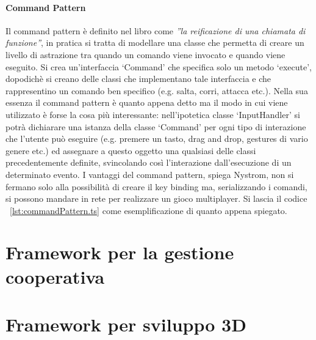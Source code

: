\paragraph{Command Pattern}
Il command pattern è definito nel libro come \textit{''la reificazione 
di una chiamata di funzione''}, in pratica si tratta di modellare una classe
che permetta di creare un livello di astrazione tra quando un comando
viene invocato e quando viene eseguito. Si crea un'interfaccia `Command'
che specifica solo un metodo `execute', dopodichè si creano delle classi
che implementano tale interfaccia e che rappresentino un comando ben specifico
(e.g. salta, corri, attacca etc.). Nella sua essenza il command pattern è quanto
appena detto ma il modo in cui viene utilizzato è forse la cosa più interessante:
nell'ipotetica classe `InputHandler' si potrà dichiarare una istanza della classe
`Command' per ogni tipo di interazione che l'utente può eseguire (e.g. premere un tasto,
drag and drop, gestures di vario genere etc.) ed assegnare a questo oggetto una qualsiasi
delle classi precedentemente definite, svincolando così l'interazione dall'esecuzione
di un determinato evento. I vantaggi del command pattern, spiega Nystrom, non si
fermano solo alla possibilità di creare il key binding ma, serializzando i comandi,
si possono mandare in rete per realizzare un gioco multiplayer. Si lascia il codice
~\ref{lst:commandPattern.ts} come esemplificazione di quanto appena spiegato.

\section{Framework per la gestione cooperativa}\label{sec:Cooperativa}

\section{Framework per sviluppo 3D}\label{sec:FW3D}